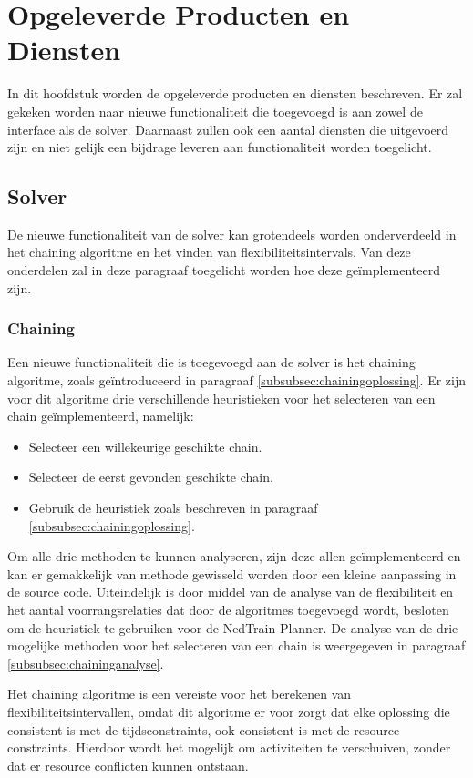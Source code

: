 \section{Opgeleverde Producten en Diensten}
In dit hoofdstuk worden de opgeleverde producten en diensten beschreven. Er zal gekeken worden naar nieuwe functionaliteit die toegevoegd is aan zowel de interface als de solver. Daarnaast zullen ook een aantal diensten die uitgevoerd zijn en niet gelijk een bijdrage leveren aan functionaliteit worden toegelicht.

\subsection{Solver}
De nieuwe functionaliteit van de solver kan grotendeels worden onderverdeeld in het chaining algoritme en het vinden van flexibiliteitsintervals. Van deze onderdelen zal in deze paragraaf toegelicht worden hoe deze ge\"implementeerd zijn.

\subsubsection{Chaining}
Een nieuwe functionaliteit die is toegevoegd aan de solver is het chaining algoritme, zoals ge\"introduceerd in paragraaf \ref{subsubsec:chainingoplossing}. Er zijn voor dit algoritme drie verschillende heuristieken voor het selecteren van een chain ge\"implementeerd, namelijk:

\begin{itemize}
\item Selecteer een willekeurige geschikte chain.
\item Selecteer de eerst gevonden geschikte chain.
\item Gebruik de heuristiek zoals beschreven in paragraaf \ref{subsubsec:chainingoplossing}.
\end{itemize}

Om alle drie methoden te kunnen analyseren, zijn deze allen ge\"implementeerd en kan er gemakkelijk van methode gewisseld worden door een kleine aanpassing in de source code. Uiteindelijk is door middel van de analyse van de flexibiliteit en het aantal voorrangsrelaties dat door de algoritmes toegevoegd wordt, besloten om de heuristiek te gebruiken voor de NedTrain Planner. De analyse van de drie mogelijke methoden voor het selecteren van een chain is weergegeven in paragraaf \ref{subsubsec:chaininganalyse}.

Het chaining algoritme is een vereiste voor het berekenen van flexibiliteitsintervallen, omdat dit algoritme er voor zorgt dat elke oplossing die consistent is met de tijdsconstraints, ook consistent is met de resource constraints. Hierdoor wordt het mogelijk om activiteiten te verschuiven, zonder dat er resource conflicten kunnen ontstaan.

